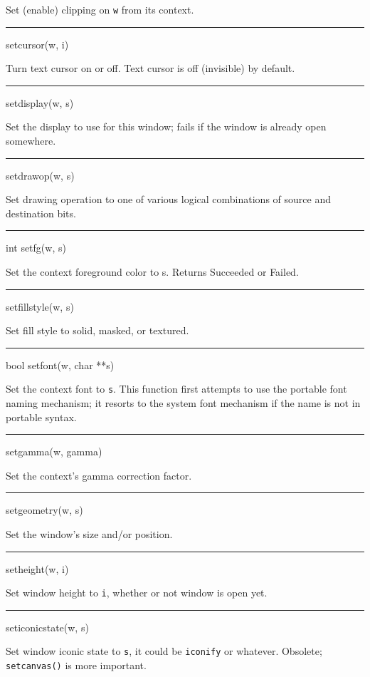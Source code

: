 Set (enable) clipping on \texttt{w} from its context.


\bigskip\hrule\vspace{0.1cm}
\noindent
setcursor(w, i)


Turn text cursor on or off. Text cursor is off (invisible) by default.


\bigskip\hrule\vspace{0.1cm}
\noindent
setdisplay(w, s)


Set the display to use for this window; fails if the window is already
open somewhere.


\bigskip\hrule\vspace{0.1cm}
\noindent
setdrawop(w, s)


Set drawing operation to one of various logical combinations of source
and destination bits.


\bigskip\hrule\vspace{0.1cm}
\noindent
int setfg(w, s)


Set the context foreground color to s. Returns Succeeded or Failed.


\bigskip\hrule\vspace{0.1cm}
\noindent
setfillstyle(w, s)


Set fill style to solid, masked, or textured.


\bigskip\hrule\vspace{0.1cm}
\noindent
bool setfont(w, char **s)


Set the context font to \texttt{s}. This function first attempts to
use the portable font naming mechanism; it resorts to the system font
mechanism if the name is not in portable syntax.


\bigskip\hrule\vspace{0.1cm}
\noindent
setgamma(w, gamma)


Set the context's gamma correction factor.


\bigskip\hrule\vspace{0.1cm}
\noindent
setgeometry(w, s)


Set the window's size and/or position.


\bigskip\hrule\vspace{0.1cm}
\noindent
setheight(w, i)


Set window height to \texttt{i}, whether or not window is open yet.


\bigskip\hrule\vspace{0.1cm}
\noindent
seticonicstate(w, s)


Set window iconic state to \texttt{s}, it could be
\texttt{{\textquotedbl}iconify{\textquotedbl}} or whatever. Obsolete;
\texttt{setcanvas()} is more important.


